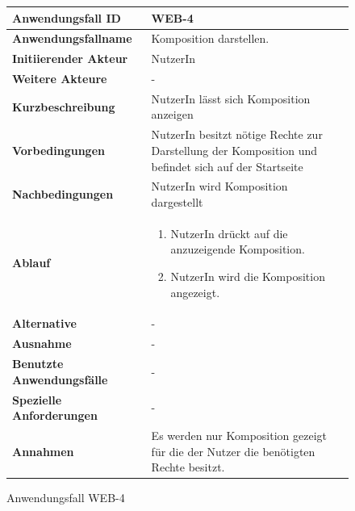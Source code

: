 \begin{figure}[h]
	\centering
	\begin{tabularx}{\textwidth}{ X | X }
		\textbf{Anwendungsfall ID} & WEB-4 \\ \hline
		\textbf{Anwendungsfallname} & Komposition darstellen. \\ \hline
		\textbf{Initiierender Akteur} & NutzerIn \\ \hline
		\textbf{Weitere Akteure} & - \\ \hline
		\textbf{Kurzbeschreibung} & NutzerIn lässt sich Komposition anzeigen \\ \hline
		\textbf{Vorbedingungen} & NutzerIn besitzt nötige Rechte zur Darstellung der Komposition und befindet sich auf der Startseite \\ \hline
		\textbf{Nachbedingungen} & NutzerIn wird Komposition dargestellt \\ \hline
		\textbf{Ablauf} &
		\begin{enumerate}
			\item  NutzerIn drückt auf die anzuzeigende Komposition.
			\item  NutzerIn wird die Komposition angezeigt.
		\end{enumerate} \\ \hline
		\textbf{Alternative} & - \\ \hline
		\textbf{Ausnahme} & - \\ \hline
		\textbf{Benutzte Anwendungsfälle} & - \\ \hline
		\textbf{Spezielle Anforderungen} & - \\ \hline
		\textbf{Annahmen} & Es werden nur Komposition gezeigt für die der Nutzer die benötigten Rechte besitzt.
	\end{tabularx}
	\caption{Anwendungsfall WEB-4}
	\label{fig:anwendungsfall-server-tabelle-web-4}
\end{figure}